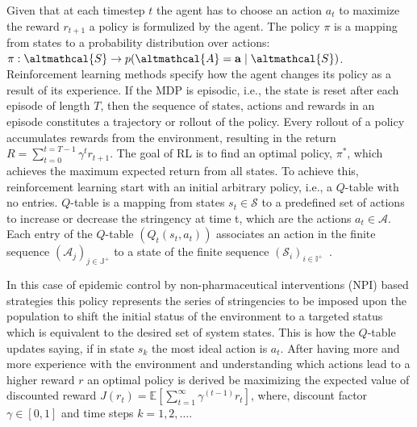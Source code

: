 \documentclass[tikz,fleqn,12pt]{wlscirep}
\begin{document}
Given that at each timestep $t$ the agent has to choose an action $a_t$ to maximize the reward $r_{t+1}$ a policy is formulized by the agent. The policy $\pi$ is a mapping from states to a probability distribution over actions: $\pi: \altmathcal{S} \rightarrow p(\altmathcal{A}=\mathbf{a} \mid \altmathcal{S})$. Reinforcement learning methods specify how the agent changes its policy as a result of its experience. If the MDP is episodic, i.e., the state is reset after each episode of length $T$, then the sequence of states, actions and rewards in an episode constitutes a trajectory or rollout of the policy. Every rollout of a policy accumulates rewards from the environment, resulting in the return $R=\sum_{t=0}^{t=T-1} \gamma^t r_{t+1}$. The goal of RL is to find an optimal policy, $\pi^*$, which achieves the maximum expected return from all states. To achieve this, reinforcement learning start with an initial arbitrary policy, i.e., a $Q$-table with no entries. $Q$-table is a mapping from states $s_t \in \mathscr{S}$ to a predefined set of actions to increase or decrease the stringency at time t, which are the actions $a_t \in \mathscr{A}$. Each entry of the $Q$-table $\left(Q_t\left(s_t, a_t\right)\right)$ associates an action in the finite sequence $\left(\mathscr{A}_j\right)_{j \in \mathbb{J}^{+}}$ to a state of the finite sequence $\left(\mathscr{S}_i\right)_{i \in \mathbb{I}^{+}}$~\cite{sutton2018reinforcement}. 

In this case of epidemic control by non-pharmaceutical interventions (NPI) based strategies this policy represents the series of stringencies to be imposed upon the population to shift the initial status of the environment to a targeted status which is equivalent to the desired set of system states. This is how the $Q$-table updates saying, if in state $s_k$ the most ideal action is $a_t$. After having more and more experience with the environment and understanding which actions lead to a higher reward $r$ an optimal policy is derived be maximizing the expected value of discounted reward $J\left(r_t\right)=\mathbb{E}\left[\sum_{t=1}^{\infty} \gamma^{(t-1)} r_t\right]$, where, discount factor $\gamma \in [0, 1]$ and time steps $k = 1, 2, \dots$.
\end{document}
